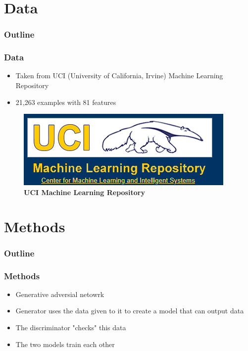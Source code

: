 \documentclass[12pt]{beamer}
\begin{document}
\section{Data}
\begin{frame}
\frametitle{Outline}
\tableofcontents[currentsection]
\end{frame}

\begin{frame}
\frametitle{Data}

\begin{itemize}
  \item Taken from UCI (University of California, Irvine) Machine Learning Repository
  \pause
  \item 21,263 examples with 81 features
  \pause
\end{itemize}

\begin{figure}[h]
  \includegraphics[scale = 0.5]{UCIRepo.png}
  \caption{\textbf{UCI Machine Learning Repository}}
\end{figure}

\end{frame}



\section{Methods}
\begin{frame}
\frametitle{Outline}
\tableofcontents[currentsection]
\end{frame}



\begin{frame}
\frametitle{Methods}

\pause
\begin{itemize}
    \item Generative adversial netowrk
    \pause
    \item Generator uses the data given to it to create a model that can output data
    \pause
    \item The discriminator "checks" this data
    \pause
    \item The two models train each other
\end{itemize}

\end{frame}
\end{document}
